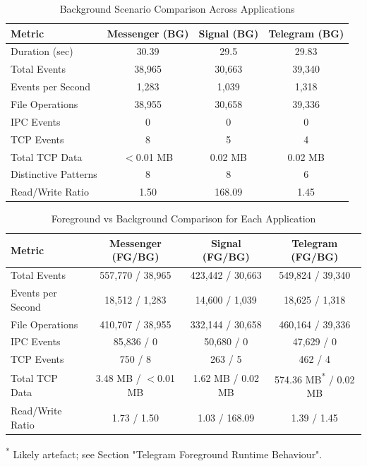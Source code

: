 \documentclass[a4paper,12pt]{report}
\begin{document}
\begin{table}[H]
    \centering
    \caption{Background Scenario Comparison Across Applications}
    \label{tab:comparison_bg_only}
    \begin{tabular}{|l|c|c|c|}
        \hline
        \textbf{Metric} & \textbf{Messenger (BG)} & \textbf{Signal (BG)} & \textbf{Telegram (BG)} \\
        \hline
        Duration (sec) & 30.39 & 29.5 & 29.83 \\
        Total Events & 38,965 & 30,663 & 39,340 \\
        Events per Second & 1,283 & 1,039 & 1,318 \\
        File Operations & 38,955 & 30,658 & 39,336 \\
        IPC Events & 0 & 0 & 0 \\
        TCP Events & 8 & 5 & 4 \\
        Total TCP Data & $<$0.01 MB & 0.02 MB & 0.02 MB \\
        Distinctive Patterns & 8 & 8 & 6 \\
        Read/Write Ratio & 1.50 & 168.09 & 1.45 \\
        \hline
    \end{tabular}
\end{table}

\begin{table}[H]
    \centering
    \footnotesize
    \caption{Foreground vs Background Comparison for Each Application}
    \label{tab:comparison_fg_vs_bg}
    \begin{tabular}{|l|c|c|c|}
        \hline
        \textbf{Metric} & \textbf{Messenger (FG/BG)} & \textbf{Signal (FG/BG)} & \textbf{Telegram (FG/BG)} \\
        \hline
        Total Events & 557,770 / 38,965 & 423,442 / 30,663 & 549,824 / 39,340 \\
        Events per Second & 18,512 / 1,283 & 14,600 / 1,039 & 18,625 / 1,318 \\
        File Operations & 410,707 / 38,955 & 332,144 / 30,658 & 460,164 / 39,336 \\
        IPC Events & 85,836 / 0 & 50,680 / 0 & 47,629 / 0 \\
        TCP Events & 750 / 8 & 263 / 5 & 462 / 4 \\
        Total TCP Data & 3.48 MB / $<$0.01 MB & 1.62 MB / 0.02 MB & 574.36 MB\textsuperscript{*} / 0.02 MB \\
        Read/Write Ratio & 1.73 / 1.50 & 1.03 / 168.09 & 1.39 / 1.45 \\
        \hline
    \end{tabular}
    \begin{flushleft}
    \footnotesize\textsuperscript{*} Likely artefact; see Section "Telegram Foreground Runtime Behaviour".
    \end{flushleft}
\end{table}
\end{document}
